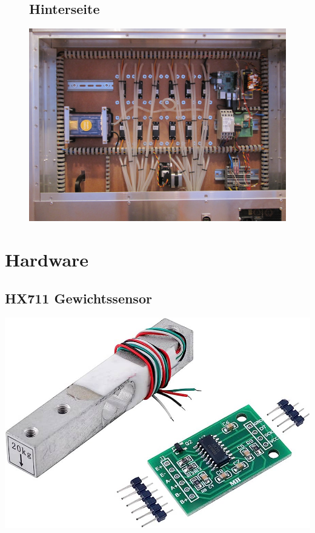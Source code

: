 \documentclass[12pt,letterpaper]{article}
\begin{document}
\begin{figure}
	\subsection{Hinterseite}
	\begin{center}
	\includegraphics[scale=0.5]{"hector9000-hinten.jpeg"}		
	\end{center}
	\end{figure}
	
	
	\newpage
	\section{Hardware}
	
	\subsection{HX711 Gewichtssensor}

	\begin{center}
	\includegraphics[scale=0.2]{hx711}
	\end{center}
	
\end{document}
